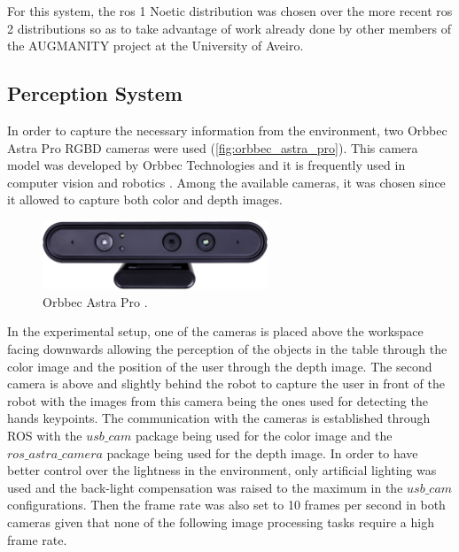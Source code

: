 For this system, the \acs{ros} 1 Noetic distribution was chosen over the more recent \acs{ros} 2 distributions so as to take advantage of work already done by other members of the AUGMANITY project at the University of Aveiro.

\subsection{Perception System}
\label{subsection:perception_system}

In order to capture the necessary information from the environment, two Orbbec Astra Pro RGBD cameras were used (\autoref{fig:orbbec_astra_pro}). This camera model was developed by Orbbec Technologies and it is frequently used in computer vision and robotics \cite{AstraPro}. Among the available cameras, it was chosen since it allowed to capture both color and depth images.

\begin{figure}[ht]
\centerline{\includegraphics[width=0.6\textwidth]{figs/AstraPro.jpg}}
\caption[Orbbec Astra Pro.]{Orbbec Astra Pro \cite{AstraPro}.}
\label{fig:orbbec_astra_pro}
\end{figure}

In the experimental setup, one of the cameras is placed above the workspace facing downwards allowing the perception of the objects in the table through the color image and the position of the user through the depth image. The second camera is above and slightly behind the robot to capture the user in front of the robot with the images from this camera being the ones used for detecting the hands keypoints. The communication with the cameras is established through ROS with the $usb\_cam$ package being used for the color image and the $ros\_astra\_camera$ package being used for the depth image. In order to have better control over the lightness in the environment, only artificial lighting was used and the back-light compensation was raised to the maximum in the $usb\_cam$ configurations. Then the frame rate was also set to 10 frames per second in both cameras given that none of the following image processing tasks require a high frame rate.

